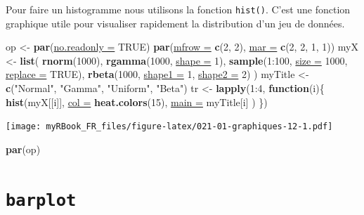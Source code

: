 \documentclass[twoside,symmetric]{book}
\newenvironment{Shaded}{}{}
\newcommand{\ControlFlowTok}[1]{\textbf{#1}}
\newcommand{\DataTypeTok}[1]{\underline{#1}}
\newcommand{\DecValTok}[1]{#1}
\newcommand{\KeywordTok}[1]{\textbf{#1}}
\newcommand{\NormalTok}[1]{#1}
\newcommand{\OperatorTok}[1]{#1}
\newcommand{\OtherTok}[1]{#1}
\newcommand{\StringTok}[1]{#1}
\begin{document}
Pour faire un histogramme nous utilisons la fonction \texttt{hist()}. C'est une fonction graphique utile pour visualiser rapidement la distribution d'un jeu de données.

\begin{Shaded}
\begin{Highlighting}[]
\NormalTok{op <-}\StringTok{ }\KeywordTok{par}\NormalTok{(}\DataTypeTok{no.readonly =} \OtherTok{TRUE}\NormalTok{)}
\KeywordTok{par}\NormalTok{(}\DataTypeTok{mfrow =} \KeywordTok{c}\NormalTok{(}\DecValTok{2}\NormalTok{, }\DecValTok{2}\NormalTok{), }\DataTypeTok{mar =} \KeywordTok{c}\NormalTok{(}\DecValTok{2}\NormalTok{, }\DecValTok{2}\NormalTok{, }\DecValTok{1}\NormalTok{, }\DecValTok{1}\NormalTok{))}
\NormalTok{myX <-}\StringTok{ }\KeywordTok{list}\NormalTok{(}
  \KeywordTok{rnorm}\NormalTok{(}\DecValTok{1000}\NormalTok{),}
  \KeywordTok{rgamma}\NormalTok{(}\DecValTok{1000}\NormalTok{, }\DataTypeTok{shape =} \DecValTok{1}\NormalTok{),}
  \KeywordTok{sample}\NormalTok{(}\DecValTok{1}\OperatorTok{:}\DecValTok{100}\NormalTok{, }\DataTypeTok{size =} \DecValTok{1000}\NormalTok{, }\DataTypeTok{replace =} \OtherTok{TRUE}\NormalTok{),}
  \KeywordTok{rbeta}\NormalTok{(}\DecValTok{1000}\NormalTok{, }\DataTypeTok{shape1 =} \DecValTok{1}\NormalTok{, }\DataTypeTok{shape2 =} \DecValTok{2}\NormalTok{)}
\NormalTok{)}
\NormalTok{myTitle <-}\StringTok{ }\KeywordTok{c}\NormalTok{(}\StringTok{"Normal"}\NormalTok{, }\StringTok{"Gamma"}\NormalTok{, }\StringTok{"Uniform"}\NormalTok{, }\StringTok{"Beta"}\NormalTok{)}
\NormalTok{tr <-}\StringTok{ }\KeywordTok{lapply}\NormalTok{(}\DecValTok{1}\OperatorTok{:}\DecValTok{4}\NormalTok{, }\ControlFlowTok{function}\NormalTok{(i)\{}
  \KeywordTok{hist}\NormalTok{(myX[[i]], }
    \DataTypeTok{col =} \KeywordTok{heat.colors}\NormalTok{(}\DecValTok{15}\NormalTok{), }
    \DataTypeTok{main =}\NormalTok{ myTitle[i]}
\NormalTok{  )}
\NormalTok{\})}
\end{Highlighting}
\end{Shaded}

\texttt{[image: myRBook\_FR\_files/figure-latex/021-01-graphiques-12-1.pdf]}

\begin{Shaded}
\begin{Highlighting}[]
\KeywordTok{par}\NormalTok{(op)}
\end{Highlighting}
\end{Shaded}

\hypertarget{graph1barplot}{%
\section{\texorpdfstring{\texttt{barplot}}{barplot}}\label{graph1barplot}}
\end{document}
